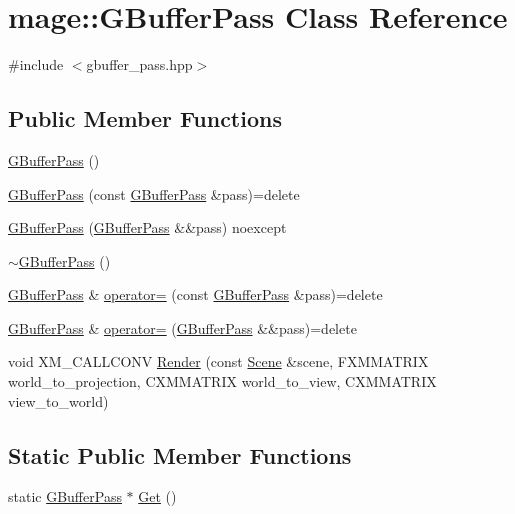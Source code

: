 \hypertarget{classmage_1_1_g_buffer_pass}{}\section{mage\+:\+:G\+Buffer\+Pass Class Reference}
\label{classmage_1_1_g_buffer_pass}


{\ttfamily \#include $<$gbuffer\+\_\+pass.\+hpp$>$}

\subsection*{Public Member Functions}
\begin{DoxyCompactItemize}
\item 
\hyperlink{classmage_1_1_g_buffer_pass_afe455d4051cddf84b7752b4bf4aa282f}{G\+Buffer\+Pass} ()
\item 
\hyperlink{classmage_1_1_g_buffer_pass_aa3c72c660c790084af696a04bf732c8b}{G\+Buffer\+Pass} (const \hyperlink{classmage_1_1_g_buffer_pass}{G\+Buffer\+Pass} \&pass)=delete
\item 
\hyperlink{classmage_1_1_g_buffer_pass_a1de0f019c704ecefc8be4d4c5c151214}{G\+Buffer\+Pass} (\hyperlink{classmage_1_1_g_buffer_pass}{G\+Buffer\+Pass} \&\&pass) noexcept
\item 
\hyperlink{classmage_1_1_g_buffer_pass_a34b2735cfb9b3546c903760f42ff770c}{$\sim$\+G\+Buffer\+Pass} ()
\item 
\hyperlink{classmage_1_1_g_buffer_pass}{G\+Buffer\+Pass} \& \hyperlink{classmage_1_1_g_buffer_pass_a8508a12bbce455330cea96044c7b24a9}{operator=} (const \hyperlink{classmage_1_1_g_buffer_pass}{G\+Buffer\+Pass} \&pass)=delete
\item 
\hyperlink{classmage_1_1_g_buffer_pass}{G\+Buffer\+Pass} \& \hyperlink{classmage_1_1_g_buffer_pass_ab5495a688674fcb7b789e7b0e728fd12}{operator=} (\hyperlink{classmage_1_1_g_buffer_pass}{G\+Buffer\+Pass} \&\&pass)=delete
\item 
void X\+M\+\_\+\+C\+A\+L\+L\+C\+O\+NV \hyperlink{classmage_1_1_g_buffer_pass_a02778a5eb3947980b204bd99daefe533}{Render} (const \hyperlink{classmage_1_1_scene}{Scene} \&scene, F\+X\+M\+M\+A\+T\+R\+IX world\+\_\+to\+\_\+projection, C\+X\+M\+M\+A\+T\+R\+IX world\+\_\+to\+\_\+view, C\+X\+M\+M\+A\+T\+R\+IX view\+\_\+to\+\_\+world)
\end{DoxyCompactItemize}
\subsection*{Static Public Member Functions}
\begin{DoxyCompactItemize}
\item 
static \hyperlink{classmage_1_1_g_buffer_pass}{G\+Buffer\+Pass} $\ast$ \hyperlink{classmage_1_1_g_buffer_pass_ab2a50a7bde900978153badaa49cf047c}{Get} ()
\end{DoxyCompactItemize}
